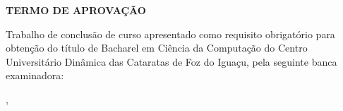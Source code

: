 \begin{folhadeaprovacao}
\begin{center}
	\vspace*{1cm}  
  	\large\textbf{TERMO DE APROVAÇÃO}
  	
  	\vspace*{1cm}
  	{\large\textbf\imprimirautor}

   \vspace*{1cm}
    {\large\textbf\imprimirtitulo}   
 \end{center}     
  
	
	\hspace{.4\textwidth}
	\SingleSpace\noindent\normalsize{Trabalho de conclusão de curso apresentado como requisito obrigatório para obtenção do título de Bacharel em Ciência da Computação do Centro Universitário Dinâmica das Cataratas de Foz do Iguaçu, pela seguinte banca examinadora:}
   
    
   \vspace*{0.5cm}  %
   \vspace*{2.5cm}
   \begin{center}
   	{\imprimirlocal, \ \imprimirdata}
   \end{center}
   
 
\end{folhadeaprovacao}